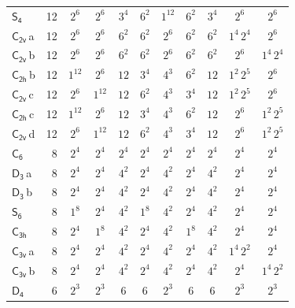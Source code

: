 \documentclass[10pt,a4paper]{article}
\numberwithin{equation}{section}
\newcommand{\grp}[1]{\mathsf{#1}}
\newcommand{\clsletter}[1]{\,{\scriptsize\color{black!55}#1}}
\begin{document}
{\begin{longtable}{@{}lrccccccccc@{}}
\href{S4.pdf}{$\grp{S_{4}}$} & 12 & $2^{6}$ & $2^{6}$ & $3^{4}$ & $6^{2}$ & $1^{12}$ & $6^{2}$ & $3^{4}$ & $2^{6}$ & $2^{6}$\\
\href{C2v.pdf}{$\grp{C_{2v}}$}\clsletter{a} & 12 & $2^{6}$ & $2^{6}$ & $6^{2}$ & $6^{2}$ & $2^{6}$ & $6^{2}$ & $6^{2}$ & $1^{4}\,2^{4}$ & $2^{6}$\\
\href{C2v.pdf}{$\grp{C_{2v}}$}\clsletter{b} & 12 & $2^{6}$ & $2^{6}$ & $6^{2}$ & $6^{2}$ & $2^{6}$ & $6^{2}$ & $6^{2}$ & $2^{6}$ & $1^{4}\,2^{4}$\\
\href{C2h.pdf}{$\grp{C_{2h}}$}\clsletter{b} & 12 & $1^{12}$ & $2^{6}$ & $12$ & $3^{4}$ & $4^{3}$ & $6^{2}$ & $12$ & $1^{2}\,2^{5}$ & $2^{6}$\\
\href{C2v.pdf}{$\grp{C_{2v}}$}\clsletter{c} & 12 & $2^{6}$ & $1^{12}$ & $12$ & $6^{2}$ & $4^{3}$ & $3^{4}$ & $12$ & $1^{2}\,2^{5}$ & $2^{6}$\\
\href{C2h.pdf}{$\grp{C_{2h}}$}\clsletter{c} & 12 & $1^{12}$ & $2^{6}$ & $12$ & $3^{4}$ & $4^{3}$ & $6^{2}$ & $12$ & $2^{6}$ & $1^{2}\,2^{5}$\\
\href{C2v.pdf}{$\grp{C_{2v}}$}\clsletter{d} & 12 & $2^{6}$ & $1^{12}$ & $12$ & $6^{2}$ & $4^{3}$ & $3^{4}$ & $12$ & $2^{6}$ & $1^{2}\,2^{5}$\\
\href{C6.pdf}{$\grp{C_{6}}$} & 8 & $2^{4}$ & $2^{4}$ & $2^{4}$ & $2^{4}$ & $2^{4}$ & $2^{4}$ & $2^{4}$ & $2^{4}$ & $2^{4}$\\
\href{D3.pdf}{$\grp{D_{3}}$}\clsletter{a} & 8 & $2^{4}$ & $2^{4}$ & $4^{2}$ & $2^{4}$ & $4^{2}$ & $2^{4}$ & $4^{2}$ & $2^{4}$ & $2^{4}$\\
\href{D3.pdf}{$\grp{D_{3}}$}\clsletter{b} & 8 & $2^{4}$ & $2^{4}$ & $4^{2}$ & $2^{4}$ & $4^{2}$ & $2^{4}$ & $4^{2}$ & $2^{4}$ & $2^{4}$\\
\href{S6.pdf}{$\grp{S_{6}}$} & 8 & $1^{8}$ & $2^{4}$ & $4^{2}$ & $1^{8}$ & $4^{2}$ & $2^{4}$ & $4^{2}$ & $2^{4}$ & $2^{4}$\\
\href{C3h.pdf}{$\grp{C_{3h}}$} & 8 & $2^{4}$ & $1^{8}$ & $4^{2}$ & $2^{4}$ & $4^{2}$ & $1^{8}$ & $4^{2}$ & $2^{4}$ & $2^{4}$\\
\href{C3v.pdf}{$\grp{C_{3v}}$}\clsletter{a} & 8 & $2^{4}$ & $2^{4}$ & $4^{2}$ & $2^{4}$ & $4^{2}$ & $2^{4}$ & $4^{2}$ & $1^{4}\,2^{2}$ & $2^{4}$\\
\href{C3v.pdf}{$\grp{C_{3v}}$}\clsletter{b} & 8 & $2^{4}$ & $2^{4}$ & $4^{2}$ & $2^{4}$ & $4^{2}$ & $2^{4}$ & $4^{2}$ & $2^{4}$ & $1^{4}\,2^{2}$\\
\href{D4.pdf}{$\grp{D_{4}}$} & 6 & $2^{3}$ & $2^{3}$ & $6$ & $6$ & $2^{3}$ & $6$ & $6$ & $2^{3}$ & $2^{3}$\\

\end{longtable}}
\end{document}
